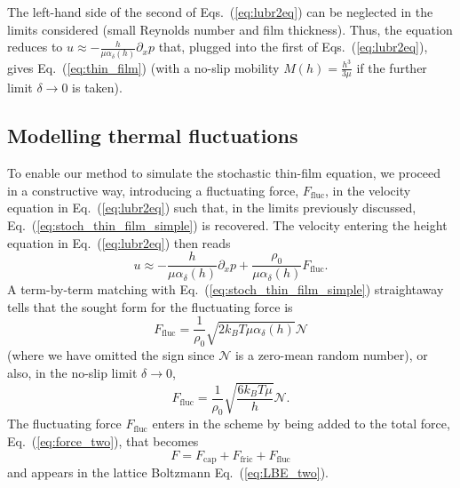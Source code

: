 The left-hand side of the second of Eqs.~(\ref{eq:lubr2eq}) can be neglected in the limits considered (small Reynolds number and film thickness). 
Thus, the equation reduces to $u \approx -\frac{h}{\mu\alpha_{\delta}(h)}\partial_x p$ that, plugged into the first of Eqs.~(\ref{eq:lubr2eq}), gives Eq.~(\ref{eq:thin_film}) (with a no-slip mobility $M(h)=\frac{h^3}{3\mu}$ if the further limit $\delta \rightarrow 0$ is taken).

\subsection{Modelling thermal fluctuations}\label{subsec:thermal_fluc_model}
To enable our method to simulate the stochastic thin-film equation, we proceed in a constructive way, introducing a fluctuating force, $F_{\text{fluc}}$, in the velocity equation in Eq.~(\ref{eq:lubr2eq}) such that, in the limits previously discussed, Eq.~(\ref{eq:stoch_thin_film_simple}) is recovered. 
The velocity entering the height equation in Eq.~(\ref{eq:lubr2eq}) then reads
\begin{equation}
  u \approx -\frac{h}{\mu \alpha_{\delta}(h)}\partial_x p + \frac{\rho_0}{\mu \alpha_{\delta}(h)}F_{\text{fluc}}.
\end{equation}
A term-by-term matching with Eq.~(\ref{eq:stoch_thin_film_simple}) straightaway tells that the sought form for the fluctuating force is
\begin{equation}
    F_{\text{fluc}} = \frac{1}{\rho_0} \sqrt{2 k_B T \mu \alpha_{\delta}(h)}\mathcal{N}
\end{equation}
(where we have omitted the sign since $\mathcal{N}$ is a zero-mean random number), or also, in the no-slip limit $\delta \rightarrow 0$, 
\begin{equation}\label{eq:thermal_force}
    F_{\text{fluc}} = \frac{1}{\rho_0}\sqrt{\frac{6k_BT\mu}{h}}\mathcal{N}.
\end{equation}
The fluctuating force $F_{\text{fluc}}$ enters in the scheme by being added to the total force, Eq.~(\ref{eq:force_two}), that becomes
\begin{equation}\label{eq:tot_force}
  F = F_{\text{cap}} + F_{\text{fric}} + F_{\text{fluc}}
\end{equation}
and appears in the lattice Boltzmann Eq.~(\ref{eq:LBE_two}).

